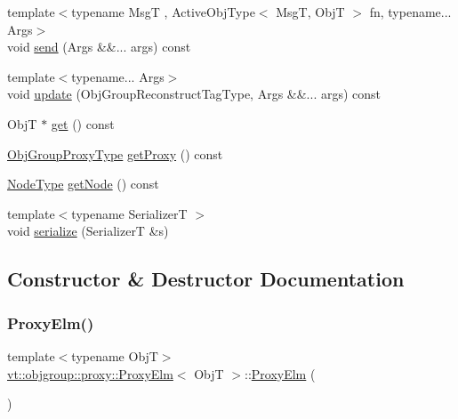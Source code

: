 \begin{DoxyCompactItemize}
\item 
{\footnotesize template$<$typename MsgT , Active\+Obj\+Type$<$ Msg\+T, Obj\+T $>$ fn, typename... Args$>$ }\\void \hyperlink{structvt_1_1objgroup_1_1proxy_1_1_proxy_elm_aadfbb21b80482657fd2a7eba65ad7b48}{send} (Args \&\&... args) const
\item 
{\footnotesize template$<$typename... Args$>$ }\\void \hyperlink{structvt_1_1objgroup_1_1proxy_1_1_proxy_elm_ac86c33cf46c63e61413b07509d3b9005}{update} (Obj\+Group\+Reconstruct\+Tag\+Type, Args \&\&... args) const
\item 
ObjT $\ast$ \hyperlink{structvt_1_1objgroup_1_1proxy_1_1_proxy_elm_a4acec5b08c91f8d23a19cc6a61b19c48}{get} () const
\item 
\hyperlink{namespacevt_ad7cae989df485fccca57f0792a880a8e}{Obj\+Group\+Proxy\+Type} \hyperlink{structvt_1_1objgroup_1_1proxy_1_1_proxy_elm_ae7cbfe997421f265fa51cd29adc6957e}{get\+Proxy} () const
\item 
\hyperlink{namespacevt_a866da9d0efc19c0a1ce79e9e492f47e2}{Node\+Type} \hyperlink{structvt_1_1objgroup_1_1proxy_1_1_proxy_elm_a2a2067c00f4d5bc4b07dfb371f2f0d7a}{get\+Node} () const
\item 
{\footnotesize template$<$typename SerializerT $>$ }\\void \hyperlink{structvt_1_1objgroup_1_1proxy_1_1_proxy_elm_aa2c6be8bfa1113516cd6e8b3d7bd0445}{serialize} (SerializerT \&s)
\end{DoxyCompactItemize}


\subsection{Constructor \& Destructor Documentation}
\mbox{\label{structvt_1_1objgroup_1_1proxy_1_1_proxy_elm_ad610547c98659b9d34a6dca416a4d319}} 
\subsubsection{\texorpdfstring{Proxy\+Elm()}{ProxyElm()}\hspace{0.1cm}{\footnotesize\ttfamily [1/4]}}
{\footnotesize\ttfamily template$<$typename ObjT$>$ \\
\hyperlink{structvt_1_1objgroup_1_1proxy_1_1_proxy_elm}{vt\+::objgroup\+::proxy\+::\+Proxy\+Elm}$<$ ObjT $>$\+::\hyperlink{structvt_1_1objgroup_1_1proxy_1_1_proxy_elm}{Proxy\+Elm} (\begin{DoxyParamCaption}{ }\end{DoxyParamCaption})\hspace{0.3cm}{\ttfamily [default]}}

